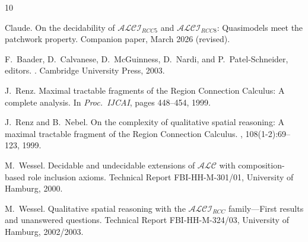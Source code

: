 \documentclass[a4paper,11pt]{article}
\theoremstyle{definition}
\begin{document}

\begin{thebibliography}{10}

Claude.
\newblock On the decidability of {$\mathcal{ALCI}_{\mathit{RCC5}}$} and
  {$\mathcal{ALCI}_{\mathit{RCC8}}$}: Quasimodels meet the patchwork
  property.
\newblock Companion paper, March 2026 (revised).

F.~Baader, D.~Calvanese, D.~McGuinness, D.~Nardi, and P.~Patel-Schneider,
  editors.
.
\newblock Cambridge University Press, 2003.

J.~Renz.
\newblock Maximal tractable fragments of the {Region Connection Calculus}: A
  complete analysis.
\newblock In {\em Proc.\ IJCAI}, pages 448--454, 1999.

J.~Renz and B.~Nebel.
\newblock On the complexity of qualitative spatial reasoning: A maximal
  tractable fragment of the {Region Connection Calculus}.
, 108(1-2):69--123, 1999.

M.~Wessel.
\newblock Decidable and undecidable extensions of {$\mathcal{ALC}$} with
  composition-based role inclusion axioms.
\newblock Technical Report FBI-HH-M-301/01, University of Hamburg, 2000.

M.~Wessel.
\newblock Qualitative spatial reasoning with the
  {$\mathcal{ALCI}_\mathit{RCC}$} family---{F}irst results and unanswered
  questions.
\newblock Technical Report FBI-HH-M-324/03, University of Hamburg, 2002/2003.

\end{thebibliography}
\end{document}
